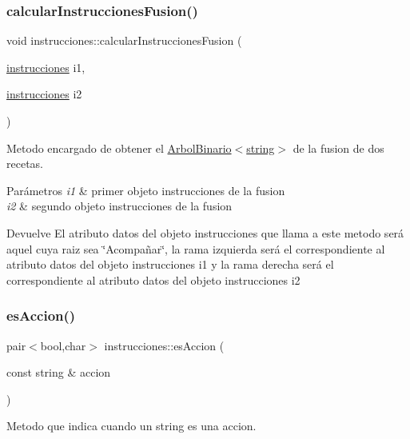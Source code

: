 \subsubsection{\texorpdfstring{calcular\+Instrucciones\+Fusion()}{calcularInstruccionesFusion()}}
{\footnotesize\ttfamily void instrucciones\+::calcular\+Instrucciones\+Fusion (\begin{DoxyParamCaption}\item[{\hyperlink{classinstrucciones}{instrucciones}}]{i1,  }\item[{\hyperlink{classinstrucciones}{instrucciones}}]{i2 }\end{DoxyParamCaption})}



Metodo encargado de obtener el \hyperlink{classArbolBinario}{Arbol\+Binario$<$string$>$} de la fusion de dos recetas. 


\begin{DoxyParams}{Parámetros}
{\em i1} & primer objeto instrucciones de la fusion \\
\hline
{\em i2} & segundo objeto instrucciones de la fusion \\
\hline
\end{DoxyParams}
\begin{DoxyReturn}{Devuelve}
El atributo datos del objeto instrucciones que llama a este metodo será aquel cuya raiz sea \char`\"{}\+Acompañar\char`\"{}, la rama izquierda será el correspondiente al atributo datos del objeto instrucciones i1 y la rama derecha será el correspondiente al atributo datos del objeto instrucciones i2 
\end{DoxyReturn}
\mbox{\label{classinstrucciones_ad5bd317fefb8e3b92016fda362206f2f}} 
\subsubsection{\texorpdfstring{es\+Accion()}{esAccion()}}
{\footnotesize\ttfamily pair$<$bool,char$>$ instrucciones\+::es\+Accion (\begin{DoxyParamCaption}\item[{const string \&}]{accion }\end{DoxyParamCaption})}



Metodo que indica cuando un string es una accion. 


